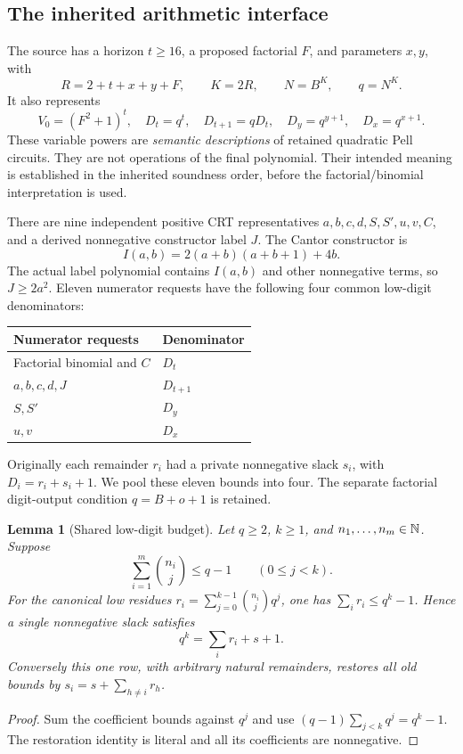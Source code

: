 \documentclass[11pt,letterpaper]{article}
\newtheorem{lemma}[theorem]{Lemma}
\theoremstyle{definition}\newtheorem{definition}[theorem]{Definition}
\theoremstyle{remark}\newtheorem{remark}[theorem]{Remark}
\begin{document}
\subsection{The inherited arithmetic interface}

The source has a horizon \(t\ge16\), a proposed factorial \(F\), and
parameters \(x,y\), with
\[
 R=2+t+x+y+F,\qquad K=2R,\qquad N=B^K,\qquad q=N^K.
\]
It also represents
\[
 V_0=(F^2+1)^t,\quad
 D_t=q^t,\quad D_{t+1}=qD_t,\quad
 D_y=q^{y+1},\quad D_x=q^{x+1}.
\]
These variable powers are \emph{semantic descriptions} of retained
quadratic Pell circuits. They are not operations of the final polynomial.
Their intended meaning is established in the inherited soundness order,
before the factorial/binomial interpretation is used.

There are nine independent positive CRT representatives
\(a,b,c,d,S,S',u,v,C\), and a derived nonnegative constructor label
\(J\). The Cantor constructor is
\[
 I(a,b)=2(a+b)(a+b+1)+4b.
\]
The actual label polynomial contains \(I(a,b)\) and other nonnegative
terms, so \(J\ge2a^2\). Eleven numerator requests have the following
four common low-digit denominators:
\begin{center}\small
\begin{tabular}{@{}ll@{}}\toprule
Numerator requests & Denominator\\\midrule
Factorial binomial and \(C\) & \(D_t\)\\
\(a,b,c,d,J\) & \(D_{t+1}\)\\
\(S,S'\) & \(D_y\)\\
\(u,v\) & \(D_x\)\\\bottomrule
\end{tabular}
\end{center}
Originally each remainder \(r_i\) had a private nonnegative slack
\(s_i\), with \(D_i=r_i+s_i+1\). We pool these eleven bounds into four.
The separate factorial digit-output condition \(q=B+o+1\) is retained.

\begin{lemma}[Shared low-digit budget]\label{lem:digits}
Let \(q\ge2\), \(k\ge1\), and \(n_1,\ldots,n_m\in\mathbb N\). Suppose
\[
 \sum_{i=1}^m\binom{n_i}{j}\le q-1\qquad(0\le j<k).
\]
For the canonical low residues
\(r_i=\sum_{j=0}^{k-1}\binom{n_i}{j}q^j\), one has
\(\sum_i r_i\le q^k-1\). Hence a single nonnegative slack satisfies
\[
 q^k=\sum_i r_i+s+1.
\]
Conversely this one row, with arbitrary natural remainders, restores
all old bounds by \(s_i=s+\sum_{h\ne i}r_h\).
\end{lemma}
\begin{proof}
Sum the coefficient bounds against \(q^j\) and use
\((q-1)\sum_{j<k}q^j=q^k-1\). The restoration identity is literal
and all its coefficients are nonnegative.
\end{proof}
\end{document}
